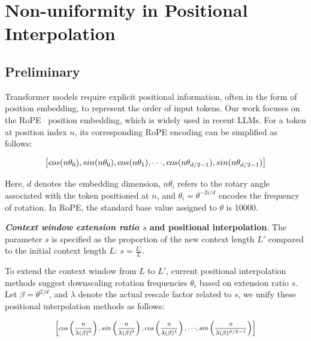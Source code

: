 \section{Non-uniformity in Positional Interpolation}
\label{sec:analysis}

\subsection{Preliminary}

Transformer models require explicit positional information, often in the form of position embedding, to represent the order of input tokens. Our work focuses on the RoPE~\cite{rope} position embedding, which is widely used in recent  LLMs. For a token at position index $n$, its corresponding RoPE encoding can be simplified as follows:

\begin{equation}
		\fontsize{7.8}{7.8} \selectfont
	\label{eq:rope}
	\left[ cos(n\theta_0), sin(n\theta_0), cos(n\theta_1), \cdot\cdot\cdot, cos(n\theta_{d/2-1}), sin(n\theta_{d/2-1}) \right]   
\end{equation}

Here, $d$ denotes the embedding dimension, $n\theta_i$ refers to the rotary angle associated with the token positioned at $n$, and $\theta_i=\theta^{-2i/d}$ encodes the frequency of rotation. In RoPE, the standard base value assigned to $\theta$ is 10000.

\textbf{\emph{Context window extension ratio $s$} and positional interpolation}. The parameter $s$ is specified as the proportion of the new context length $L'$ compared to the initial context length $L$: $s=\frac{L'}{L}$.

To extend the context window from $L$ to $L'$, current positional interpolation methods suggest downscaling rotation frequencies $\theta_i$ based on extension ratio $s$. Let $\beta=\theta^{2/d}$, and $\lambda$ denote the actual rescale factor related to $s$, we   unify these positional interpolation methods as follows:

\begin{equation}	
	\fontsize{7.5}{7.5} \selectfont
	\label{eq:unified_rope}
	\begin{aligned}
		\left[cos\left(\frac{n}{\lambda(\beta)^0}\right), sin \left(\frac{n}{\lambda(\beta)^0}\right), cos\left(\frac{n}{\lambda(\beta)^1}\right), \cdot\cdot\cdot,  sin \left(\frac{n}{\lambda(\beta)^{d/2-1}}\right) \right]   
	\end{aligned}
\end{equation}

